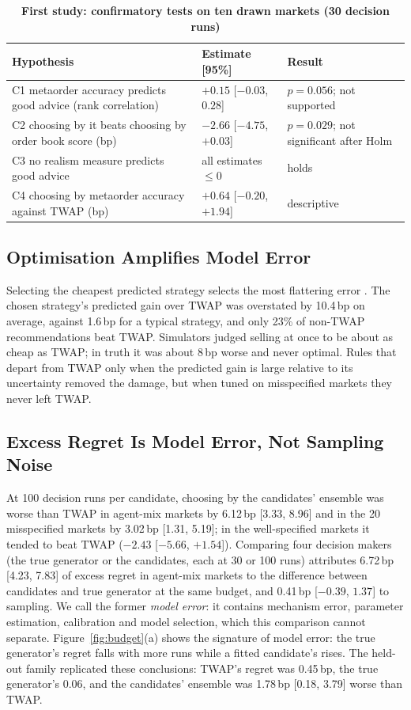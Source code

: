\documentclass{ieeeaccess}
\newcommand{\bp}{\,bp}
\begin{document}
\begin{table}
\caption{\textbf{First study: confirmatory tests on ten drawn markets (30 decision runs)}}
\label{tab:confirm}
\setlength{\tabcolsep}{3pt}
\begin{tabular}{|p{98pt}|p{70pt}|p{48pt}|}
\hline
Hypothesis & Estimate [95\%] & Result \\
\hline
C1 metaorder accuracy predicts good advice (rank correlation) & $+0.15$ [$-0.03$, $0.28$] & $p=0.056$; not supported \\
C2 choosing by it beats choosing by order book score (bp) & $-2.66$ [$-4.75$, $+0.03$] & $p=0.029$; not significant after Holm \\
C3 no realism measure predicts good advice & all estimates $\le 0$ & holds \\
C4 choosing by metaorder accuracy against TWAP (bp) & $+0.64$ [$-0.20$, $+1.94$] & descriptive \\
\hline
\end{tabular}
\end{table}

\subsection{Optimisation Amplifies Model Error}
Selecting the cheapest predicted strategy selects the most flattering error \cite{smith2006optimizer}. The chosen
strategy's predicted gain over TWAP was overstated by 10.4\bp{} on average, against 1.6\bp{} for a typical strategy, and
only 23\% of non-TWAP recommendations beat TWAP. Simulators judged selling at once to be about as cheap as TWAP; in truth
it was about 8\bp{} worse and never optimal. Rules that depart from TWAP only when the predicted gain is large relative
to its uncertainty removed the damage, but when tuned on misspecified markets they never left TWAP.

\subsection{Excess Regret Is Model Error, Not Sampling Noise}
At 100 decision runs per candidate, choosing by the candidates' ensemble was worse than TWAP in agent-mix markets by
6.12\bp{} [3.33, 8.96] and in the 20 misspecified markets by 3.02\bp{} [1.31, 5.19]; in the well-specified markets it
tended to beat TWAP ($-2.43$ [$-5.66$, $+1.54$]). Comparing four decision makers (the true generator or the candidates,
each at 30 or 100 runs) attributes 6.72\bp{} [4.23, 7.83] of excess regret in agent-mix markets to the difference between
candidates and true generator at the same budget, and 0.41\bp{} [$-0.39$, $1.37$] to sampling. We call the former
\emph{model error}: it contains mechanism error, parameter estimation, calibration and model selection, which this
comparison cannot separate. Figure~\ref{fig:budget}(a) shows the signature of model error: the true generator's regret
falls with more runs while a fitted candidate's rises. The held-out family replicated these conclusions: TWAP's regret
was 0.45\bp, the true generator's 0.06, and the candidates' ensemble was 1.78\bp{} [0.18, 3.79] worse than TWAP.
\end{document}
